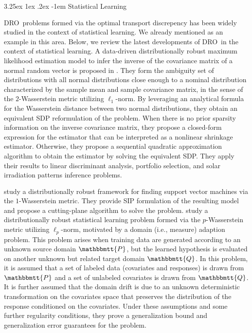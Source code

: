 \documentclass[final,onefignum,onetabnum]{class}
\makeatletter
\renewcommand\paragraph{\@startsection{paragraph}{4}{\z@}%
  {3.25ex \@plus1ex \@minus.2ex}%
  {-1em}%
  {\normalfont\normalsize\bfseries}}
\newcommand{\Ts}[1]{\mathbbmtt{#1}} %
\newcommand{\dro}{DRO}
\makeatother
\begin{document}
\paragraph{Statistical Learning}

\dro\ problems formed via the optimal transport discrepency has been widely studied in the context of statistical learning. We already mentioned \citet{mehrotra2014} as an example in this area. Below, we review the latest developments of \dro\ in the context of statistical learning.  
A data-driven distributionally robust maximum likelihood estimation model to infer the inverse of the covariance matrix of a normal random vector is proposed in \citet{nguyen2018}. 
They form the ambiguity set of distributions with all normal distributions close enough to a nominal distribution characterized by the sample mean and sample covariance matrix, in the sense of  the $2$-Wasserstein metric utilizing $\ell_1$-norm. By leveraging an analytical formula for the Wasserstein distance between two normal distributions, they obtain an equivalent SDP reformulation of the problem. When there is no prior sparsity information on the inverse covariance matrix, they propose a closed-form expression for the estimator that can be interpreted as a nonlinear shrinkage estimator. Otherwise, they propose a sequential quadratic approximation algorithm to obtain the estimator by solving the equivalent SDP. They apply their results to linear discriminant
analysis, portfolio selection, and solar irradiation patterns inference problems. 

\citet{lee2015} study a distributionally robust  framework for finding  support vector machines   via the $1$-Wasserstein metric. They  provide SIP formulation of the resulting model and propose a cutting-plane algorithm to solve the problem.
\citet{lee2017,lee2018stat} study a distributionally robust statistical learning problem formed via the  $p$-Wasserstein metric utilizing $\ell_{p}$-norm, motivated by a domain (i.e., measure) adaption problem. This problem arises when training data are generated according to an unknown source domain $\Ts{P}$, but the learned hypothesis is evaluated on another unknown but related  target domain
$\Ts{Q}$. In this problem, it is assumed that a set of labeled data (covariates and responses) is drawn from $\Ts{P}$ and a set of unlabeled covariates is drawn from $\Ts{Q}$. It is further assumed that the domain drift is due to an unknown deterministic  transformation on the covariates space that  preserves the  distribution of the response conditioned on  the covariates. Under these assumptions and some further regularity conditions,  they prove a generalization bound and generalization error guarantees for the problem. 
\end{document}
